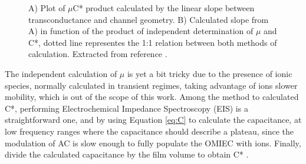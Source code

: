  \begin{figure}[h]
 	\centering
 	\hspace{2em}
 	\caption{A) Plot of $\mu$C* product calculated by the linear slope between transconductance and channel geometry. B) Calculated slope from A) in function of the product of independent determination of $\mu$ and C*, dotted line representes the 1:1 relation between both methods of calculation. Extracted from reference %
 		\cite{inalBenchmarkingOrganicMixed2017}.}
 	\label{fig:gmuc}
 \end{figure}

The independent calculation of $\mu$ is yet a bit tricky due to the presence of ionic species, normally calculated in transient regimes, taking advantage of ions slower mobility, which is out of the scope of this work. Among the method to calculated C*, performing Electrochemical Impedance Spectroscopy (EIS) is a straightforward one, and by using Equation \ref{eq:C} to calculate the capacitance, at low frequency ranges where the capacitance should describe a plateau, since the modulation of AC is slow enough to fully populate the OMIEC with ions. Finally, divide the calculated capacitance by the film volume to obtain C*%
 \cite{ohayonGuideCharacterizationOrganic2023}.

